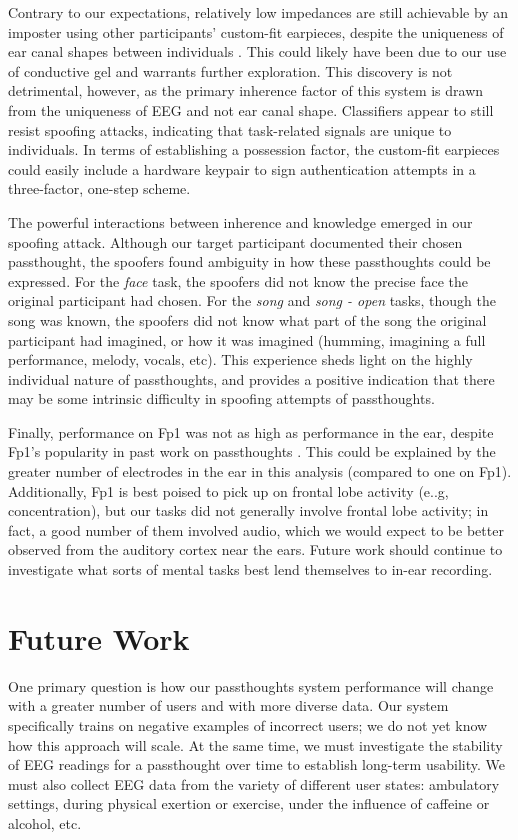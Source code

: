 \documentclass{sigchi}
\begin{document}
Contrary to our expectations, relatively low impedances are still achievable by an imposter using other participants' custom-fit earpieces, despite the uniqueness of ear canal shapes between individuals \cite{Akkermans2005}. This could likely have been due to our use of conductive gel and warrants further exploration. This discovery is not detrimental, however, as the primary inherence factor of this system is drawn from the uniqueness of EEG and not ear canal shape. Classifiers appear to still resist spoofing attacks, indicating that task-related signals are unique to individuals. In terms of establishing a possession factor, the custom-fit earpieces could easily include a hardware keypair to sign authentication attempts in a three-factor, one-step scheme.

The powerful interactions between inherence and knowledge emerged in our spoofing attack. Although our target participant documented their chosen passthought, the spoofers found ambiguity in how these passthoughts could be expressed. For the \textit{face} task, the spoofers did not know the precise face the original participant had chosen. For the \textit{song} and \textit{song - open} tasks, though the song was known, the spoofers did not know what part of the song the original participant had imagined, or how it was imagined (humming, imagining a full performance, melody, vocals, etc). This experience sheds light on the highly individual nature of passthoughts, and provides a positive indication that there may be some intrinsic difficulty in spoofing attempts of passthoughts.

Finally, performance on Fp1 was not as high as performance in the ear, despite Fp1's popularity in past work on passthoughts \cite{Chuang2013b}. This could be explained by the greater number of electrodes in the ear in this analysis (compared to one on Fp1). Additionally, Fp1 is best poised to pick up on frontal lobe activity (e..g, concentration), but our tasks did not generally involve frontal lobe activity; in fact, a good number of them involved audio, which we would expect to be better observed from the auditory cortex near the ears. Future work should continue to investigate what sorts of mental tasks best lend themselves to in-ear recording.

\section{Future Work}

One primary question is how our passthoughts system performance will change with a greater number of users and with more diverse data. Our system specifically trains on negative examples of incorrect users; we do not yet know how this approach will scale. At the same time, we must investigate the stability of EEG readings for a passthought over time to establish long-term usability. We must also collect EEG data from the variety of different user states: ambulatory settings, during physical exertion or exercise, under the influence of caffeine or alcohol, etc.
\end{document}
